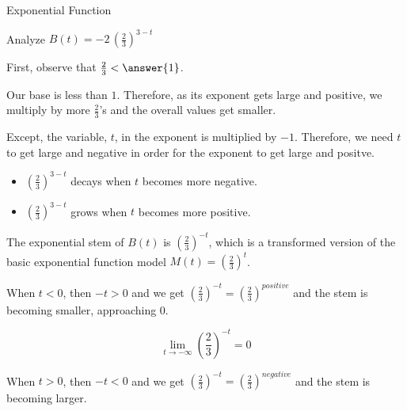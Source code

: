 \documentclass{ximera}
\begin{document}
\begin{example}  Exponential Function



Analyze   $B(t) = -2 \, \left( \frac{2}{3} \right)^{3-t}$ \\


\begin{observation}


First, observe that $\frac{2}{3} < \answer{1}$.


Our base is less than $1$.  Therefore, as its exponent gets large and positive, we multiply by more $\frac{2}{3}$'s and the overall values get smaller.


Except, the variable, $t$, in the exponent is multiplied by $-1$.  Therefore, we need $t$ to get large and negative in order for the exponent to get large and positve.


\begin{itemize}
\item $\left( \frac{2}{3} \right)^{3-t}$ decays when $t$ becomes more negative.
\item $\left( \frac{2}{3} \right)^{3-t}$ grows when $t$ becomes more positive.
\end{itemize}





\end{observation}



\begin{explanation}




\begin{model}

The exponential stem of $B(t)$ is $\left( \frac{2}{3} \right)^{-t}$, which is a transformed version of the basic exponential function model $M(t) = \left( \frac{2}{3} \right)^{t}$.  



When $t < 0$, then $-t > 0$ and we get  $\left( \frac{2}{3} \right)^{-t} = \left( \frac{2}{3} \right)^{positive}$ and the stem is becoming smaller, approaching $0$.  





\[ \lim\limits_{t \to -\infty} \left( \frac{2}{3} \right)^{-t} = 0 \]



When $t > 0$, then $-t < 0$ and we get  $\left( \frac{2}{3} \right)^{-t} = \left( \frac{2}{3} \right)^{negative}$ and the stem is becoming larger.  




\end{model}
\end{explanation}
\end{example}
\end{document}
